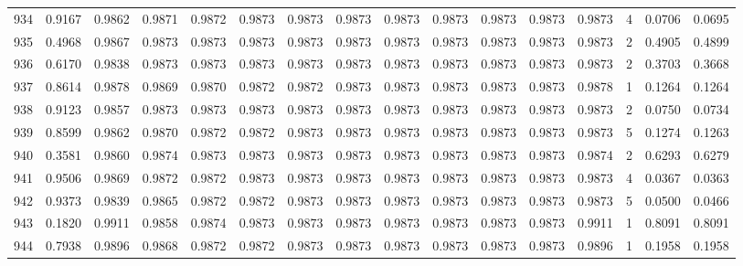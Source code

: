 \begin{tabular}{lrrrrrrrrrrrrrrr}
934 &      0.9167 &  0.9862 &  0.9871 &  0.9872 &  0.9873 &  0.9873 &  0.9873 &  0.9873 &  0.9873 &  0.9873 &   0.9873 &     0.9873 &      4 &                    0.0706 &                     0.0695 \\
935 &      0.4968 &  0.9867 &  0.9873 &  0.9873 &  0.9873 &  0.9873 &  0.9873 &  0.9873 &  0.9873 &  0.9873 &   0.9873 &     0.9873 &      2 &                    0.4905 &                     0.4899 \\
936 &      0.6170 &  0.9838 &  0.9873 &  0.9873 &  0.9873 &  0.9873 &  0.9873 &  0.9873 &  0.9873 &  0.9873 &   0.9873 &     0.9873 &      2 &                    0.3703 &                     0.3668 \\
937 &      0.8614 &  0.9878 &  0.9869 &  0.9870 &  0.9872 &  0.9872 &  0.9873 &  0.9873 &  0.9873 &  0.9873 &   0.9873 &     0.9878 &      1 &                    0.1264 &                     0.1264 \\
938 &      0.9123 &  0.9857 &  0.9873 &  0.9873 &  0.9873 &  0.9873 &  0.9873 &  0.9873 &  0.9873 &  0.9873 &   0.9873 &     0.9873 &      2 &                    0.0750 &                     0.0734 \\
939 &      0.8599 &  0.9862 &  0.9870 &  0.9872 &  0.9872 &  0.9873 &  0.9873 &  0.9873 &  0.9873 &  0.9873 &   0.9873 &     0.9873 &      5 &                    0.1274 &                     0.1263 \\
940 &      0.3581 &  0.9860 &  0.9874 &  0.9873 &  0.9873 &  0.9873 &  0.9873 &  0.9873 &  0.9873 &  0.9873 &   0.9873 &     0.9874 &      2 &                    0.6293 &                     0.6279 \\
941 &      0.9506 &  0.9869 &  0.9872 &  0.9872 &  0.9873 &  0.9873 &  0.9873 &  0.9873 &  0.9873 &  0.9873 &   0.9873 &     0.9873 &      4 &                    0.0367 &                     0.0363 \\
942 &      0.9373 &  0.9839 &  0.9865 &  0.9872 &  0.9872 &  0.9873 &  0.9873 &  0.9873 &  0.9873 &  0.9873 &   0.9873 &     0.9873 &      5 &                    0.0500 &                     0.0466 \\
943 &      0.1820 &  0.9911 &  0.9858 &  0.9874 &  0.9873 &  0.9873 &  0.9873 &  0.9873 &  0.9873 &  0.9873 &   0.9873 &     0.9911 &      1 &                    0.8091 &                     0.8091 \\
944 &      0.7938 &  0.9896 &  0.9868 &  0.9872 &  0.9872 &  0.9873 &  0.9873 &  0.9873 &  0.9873 &  0.9873 &   0.9873 &     0.9896 &      1 &                    0.1958 &                     0.1958 \\

\end{tabular}
